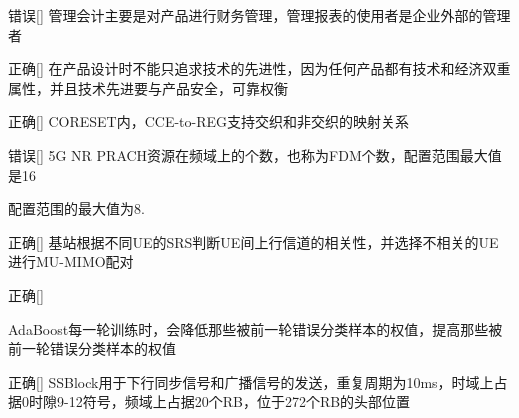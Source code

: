 \begin{choice}{\;错误\;}[]
    管理会计主要是对产品进行财务管理，管理报表的使用者是企业外部的管理者
\end{choice}

\begin{choice}{\;正确\;}[]
    在产品设计时不能只追求技术的先进性，因为任何产品都有技术和经济双重属性，并且技术先进要与产品安全，可靠权衡
\end{choice}

\begin{choice}{\;正确\;}[]
    CORESET内，CCE-to-REG支持交织和非交织的映射关系

\end{choice}


\begin{choice}{\;错误\;}[]
    5G NR PRACH资源在频域上的个数，也称为FDM个数，配置范围最大值是16

\end{choice}
\begin{solution}
    配置范围的最大值为8.

\end{solution}
\begin{choice}{\;正确\;}[]
    基站根据不同UE的SRS判断UE间上行信道的相关性，并选择不相关的UE进行MU-MIMO配对

\end{choice}

\begin{choice}{\;正确\;}[]

    AdaBoost每一轮训练时，会降低那些被前一轮错误分类样本的权值，提高那些被前一轮错误分类样本的权值
\end{choice}


\begin{choice}{\;正确\;}[]
    SSBlock用于下行同步信号和广播信号的发送，重复周期为10ms，时域上占据0时隙9-12符号，频域上占据20个RB，位于272个RB的头部位置

\end{choice}











